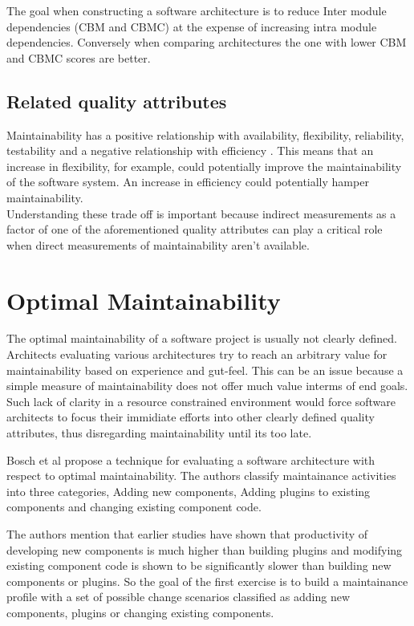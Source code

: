 \documentclass[dvips,12pt]{article}
\begin{document}
The goal when constructing a software architecture is to reduce Inter module dependencies (CBM and CBMC) at the expense of increasing intra module dependencies. Conversely when comparing architectures the one with lower CBM and CBMC scores are better.


\subsection{Related quality attributes}
Maintainability has a positive relationship with availability, flexibility, reliability, testability and a negative relationship with efficiency \cite{karl_software_2003}. This means that an increase in flexibility, for example, could potentially improve the maintainability of the software system. An increase in efficiency could potentially hamper maintainability.\\

Understanding these trade off is important because indirect measurements as a factor of one of the aforementioned quality attributes can play a critical role when direct measurements of maintainability aren't available.

\section{Optimal Maintainability}

The optimal maintainability of a software project is usually not clearly defined. Architects evaluating various architectures try to reach an arbitrary value for maintainability based on experience and gut-feel. This can be an issue because a simple measure of maintainability does not offer much value interms of end goals. Such lack of clarity in a resource constrained environment would force software architects to focus their immidiate efforts into other clearly defined quality attributes, thus disregarding maintainability until its too late.

Bosch et al \cite{bosch_assessing_2001} propose a technique for evaluating a software architecture with respect to optimal maintainability. The authors classify maintainance activities into three categories, Adding new components, Adding plugins to existing components and changing existing component code.

The authors mention that earlier studies \cite{henry_quantitative_1997} \cite{maxwell_software_1996} have shown that productivity of developing new components is much higher than building plugins and modifying existing component code is shown to be significantly slower than building new components or plugins. So the goal of the first exercise is to build a maintainance profile with a set of possible change scenarios classified as adding new components, plugins or changing existing components. 
\end{document}

